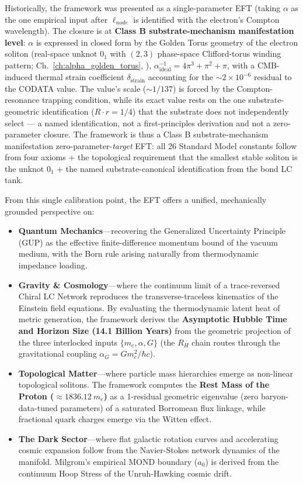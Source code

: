 Historically, the framework was presented as a single-parameter EFT (taking $\alpha$ as the one empirical input after $\ell_{node}$ is identified with the electron's Compton wavelength). The closure is at \textbf{Class B substrate-mechanism manifestation level}: $\alpha$ is expressed in closed form by the Golden Torus geometry of the electron soliton (real-space unknot $0_1$ with $(2,3)$ phase-space Clifford-torus winding pattern; Ch.~\ref{ch:alpha_golden_torus}, ), $\alpha^{-1}_{\text{ideal}} = 4\pi^3 + \pi^2 + \pi$, with a CMB-induced thermal strain coefficient $\delta_{\text{strain}}$ accounting for the $\sim 2 \times 10^{-6}$ residual to the CODATA value. The value's scale ($\sim 1/137$) is forced by the Compton-resonance trapping condition, while its exact value rests on the one substrate-geometric identification ($R \cdot r = 1/4$) that the substrate does not independently select --- a named identification, not a first-principles derivation and not a zero-parameter closure. The framework is thus a Class B substrate-mechanism manifestation zero-parameter-\emph{target} EFT: all 26 Standard Model constants follow from four axioms + the topological requirement that the smallest stable soliton is the unknot $0_1$ + the named substrate-canonical identification from the bond LC tank.

From this single calibration point, the EFT offers a unified, mechanically grounded perspective on:
\begin{itemize}
    \item \textbf{Quantum Mechanics}---recovering the Generalized Uncertainty Principle (GUP) as the effective finite-difference momentum bound of the vacuum medium, with the Born rule arising naturally from thermodynamic impedance loading.
    \item \textbf{Gravity \& Cosmology}---where the continuum limit of a trace-reversed Chiral LC Network reproduces the transverse-traceless kinematics of the Einstein field equations. By evaluating the thermodynamic latent heat of metric generation, the framework derives the \textbf{Asymptotic Hubble Time and Horizon Size (14.1 Billion Years)} from the geometric projection of the three interlocked inputs $\{m_e, \alpha, G\}$ (the $R_H$ chain routes through the gravitational coupling $\alpha_G = G m_e^2/\hbar c$).
    \item \textbf{Topological Matter}---where particle mass hierarchies emerge as non-linear topological solitons. The framework computes the \textbf{Rest Mass of the Proton ($\approx 1836.12\ m_e$)} as a 1-residual geometric eigenvalue (zero baryon-data-tuned parameters) of a saturated Borromean flux linkage, while fractional quark charges emerge via the Witten effect.
    \item \textbf{The Dark Sector}---where flat galactic rotation curves and accelerating cosmic expansion follow from the Navier-Stokes network dynamics of the manifold. Milgrom's empirical MOND boundary ($a_0$) is derived from the continuum Hoop Stress of the Unruh-Hawking cosmic drift.
\end{itemize}

